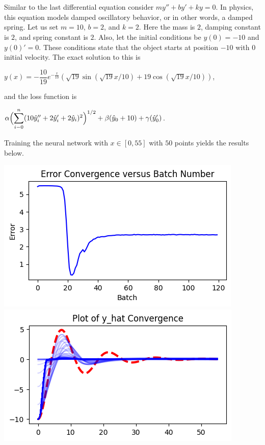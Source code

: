 \documentclass[12pt]{article}
\newcommand{\dsum}[2]{\mathlarger{\sum}_{#1}^{#2}}
\newcommand{\bgc}{\begin{center}}
\newcommand{\enc}{\end{center}}
\begin{document}
\begin{description}
\begin{minipage}{\linewidth}
    \end{minipage}
    \hfill \\
    \hline
    \hfill \\
    Similar to the last differential equation consider $my'' + by' + ky = 0$.
    In physics, this equation models damped oscillatory behavior, or in other
    words, a damped spring. Let us set $m = 10$, $b = 2$, and $k = 2$. Here the
    mass is $2$, damping constant is $2$, and spring constant is $2$.  Also,
    let the initial conditions be $y(0) = -10$ and $y(0)' = 0$. These
    conditions state that the object starts at position $-10$ with $0$ initial
    velocity. The exact solution to this is 
    \bgc 
    $y(x) = -\dfrac{10}{19} e^{-\frac{x}{10}} (\sqrt{19}\sin(\sqrt{19}x/10) + 19\cos(\sqrt{19}x/10))$,
    \enc
    and the loss function is 
    \bgc 
    $\alpha\Bigl(\dsum{i-0}{n}(10\hat{y}_i'' + 2\hat{y}_i' + 2\hat{y}_i)^2\Bigr)^{1/2} 
    + \beta(\hat{y}_0 + 10)
    + \gamma(\hat{y}_0')$.
    \enc
    Training the neural network with $x\in[0, 55]$ with $50$ points yields the
    results below. \\ 
    \begin{minipage}{\linewidth}
        \centering
        \includegraphics[scale=.5]{images/figure13.png}
        \includegraphics[scale=.5]{images/figure14.png}

\end{minipage}
\end{description}
\end{document}

